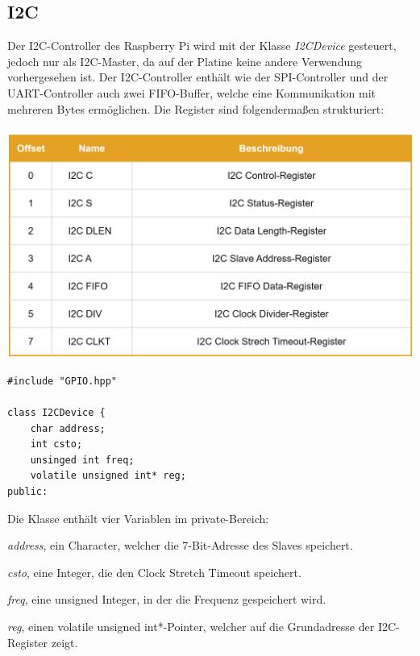\documentclass[12pt]{article}
\begin{document}
\subsection{I2C}
Der I2C-Controller des Raspberry Pi wird mit der Klasse \textit{I2CDevice} gesteuert, jedoch nur als I2C-Master, da auf der Platine keine andere Verwendung vorhergesehen ist. Der I2C-Controller enthält wie der SPI-Controller und der UART-Controller auch zwei FIFO-Buffer, welche eine Kommunikation mit mehreren Bytes ermöglichen. Die Register sind folgendermaßen strukturiert:\\\\
\includegraphics[width=\textwidth]{img/i2c_table.png}
\begin{center}\end{center}
\begin{verbatim}
#include "GPIO.hpp"

class I2CDevice {
    char address;
    int csto;
    unsinged int freq;
    volatile unsigned int* reg;
public:
\end{verbatim}
\vspace{-2mm}
Die Klasse enthält vier Variablen im private-Bereich:
\begin{compactitem}
\item \textit{address}, ein Character, welcher die 7-Bit-Adresse des Slaves speichert.
\item \textit{csto}, eine Integer, die den Clock Stretch Timeout speichert.
\item \textit{freq}, eine unsigned Integer, in der die Frequenz gespeichert wird.
\item \textit{reg}, einen volatile unsigned int*-Pointer, welcher auf die Grundadresse der I2C-Register zeigt.
\end{compactitem}
\end{document}
